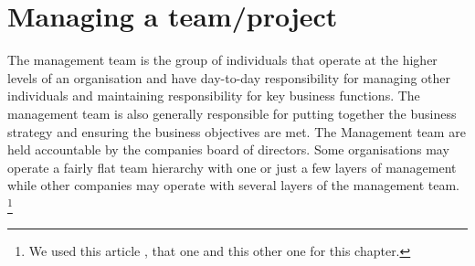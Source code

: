 \documentclass[a4paper,12pt]{report} %
\begin{document}
\chapter{Managing a team/project}\newpage

The management team is the group of individuals that operate at the higher levels of an organisation and have day-to-day responsibility for managing other individuals and maintaining responsibility for key business functions. \newline
The management team is also generally responsible for putting together the business strategy and ensuring the business objectives are met. The Management team are held accountable by the companies board of directors. \newline
Some organisations may operate a fairly flat team hierarchy with one or just a few layers of management while other companies may operate with several layers of the management team.
\footnote{We used this article \cite{Manager:4}, that one \cite{Manager:5} and this other one \cite{Manager:6} for this chapter.}

\end{document}
